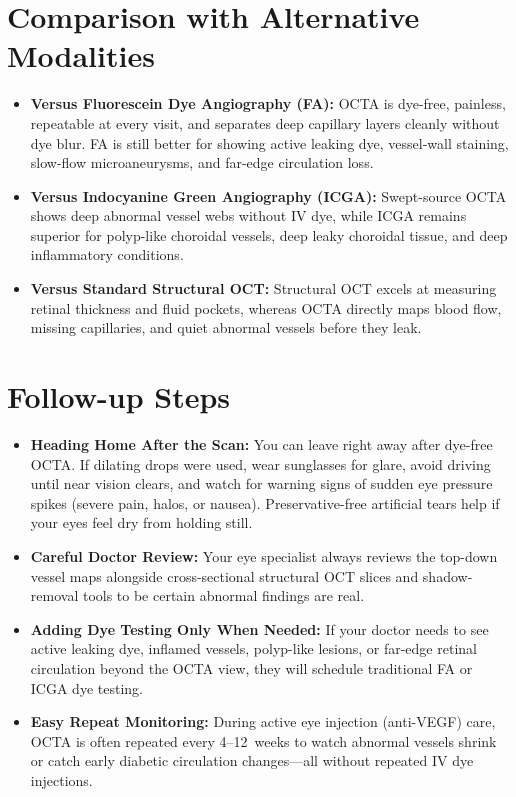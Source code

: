 \section{Comparison with Alternative Modalities}
\begin{itemize}
\item \textbf{Versus Fluorescein Dye Angiography (FA):} OCTA is dye-free, painless, repeatable at every visit, and separates deep capillary layers cleanly without dye blur. FA is still better for showing active leaking dye, vessel-wall staining, slow-flow microaneurysms, and far-edge circulation loss.
\item \textbf{Versus Indocyanine Green Angiography (ICGA):} Swept-source OCTA shows deep abnormal vessel webs without IV dye, while ICGA remains superior for polyp-like choroidal vessels, deep leaky choroidal tissue, and deep inflammatory conditions.
\item \textbf{Versus Standard Structural OCT:} Structural OCT excels at measuring retinal thickness and fluid pockets, whereas OCTA directly maps blood flow, missing capillaries, and quiet abnormal vessels before they leak.
\end{itemize}

\section{Follow-up Steps}
\begin{itemize}
\item \textbf{Heading Home After the Scan:} You can leave right away after dye-free OCTA. If dilating drops were used, wear sunglasses for glare, avoid driving until near vision clears, and watch for warning signs of sudden eye pressure spikes (severe pain, halos, or nausea). Preservative-free artificial tears help if your eyes feel dry from holding still.
\item \textbf{Careful Doctor Review:} Your eye specialist always reviews the top-down vessel maps alongside cross-sectional structural OCT slices and shadow-removal tools to be certain abnormal findings are real.
\item \textbf{Adding Dye Testing Only When Needed:} If your doctor needs to see active leaking dye, inflamed vessels, polyp-like lesions, or far-edge retinal circulation beyond the OCTA view, they will schedule traditional FA or ICGA dye testing.
\item \textbf{Easy Repeat Monitoring:} During active eye injection (anti-VEGF) care, OCTA is often repeated every 4--12~weeks to watch abnormal vessels shrink or catch early diabetic circulation changes---all without repeated IV dye injections.
\end{itemize}


